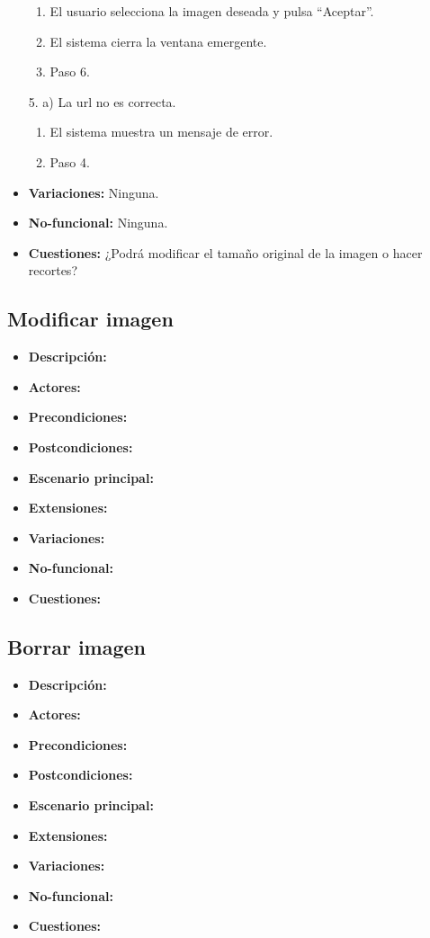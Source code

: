 \documentclass[12pt,letterpaper]{article}
\begin{document}
\begin{itemize}
\begin{enumerate}
		\item El usuario selecciona la imagen deseada y pulsa ``Aceptar''.
		\item El sistema cierra la ventana emergente.
		\item Paso 6.
	\end{enumerate}
	5. a) La url no es correcta.
	\begin{enumerate}
		\item El sistema muestra un mensaje de error.
		\item Paso 4.
	\end{enumerate}
	\item \textbf{Variaciones:} Ninguna.
	\item \textbf{No-funcional:} Ninguna.
	\item \textbf{Cuestiones:} ¿Podrá modificar el tamaño original de la imagen o hacer recortes?
\end{itemize}

\subsection{Modificar imagen}
\begin{itemize}
	\item \textbf{Descripción:}
	\item \textbf{Actores:}
	\item \textbf{Precondiciones:}
	\item \textbf{Postcondiciones:}
	\item \textbf{Escenario principal:}
	\item \textbf{Extensiones:}
	\item \textbf{Variaciones:}
	\item \textbf{No-funcional:}
	\item \textbf{Cuestiones:}
\end{itemize}

\subsection{Borrar imagen}
\begin{itemize}
	\item \textbf{Descripción:}
	\item \textbf{Actores:}
	\item \textbf{Precondiciones:}
	\item \textbf{Postcondiciones:}
	\item \textbf{Escenario principal:}
	\item \textbf{Extensiones:}
	\item \textbf{Variaciones:}
	\item \textbf{No-funcional:}
	\item \textbf{Cuestiones:}
\end{itemize}
\end{document}
